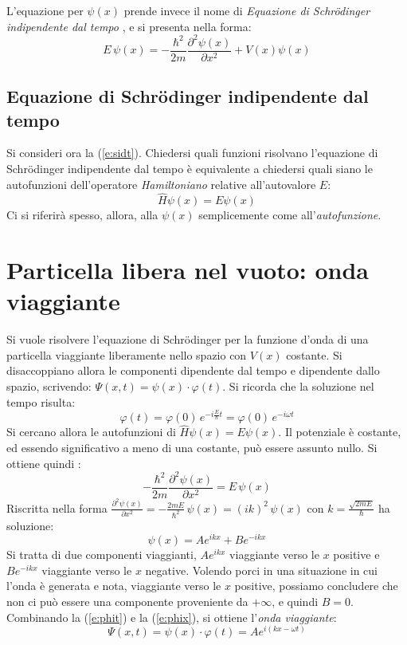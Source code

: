 \documentclass{article}
\newcommand{\schr}{Schr\"odinger }
\newcommand{\ham}{\emph{Hamiltoniano }}
\begin{document}
L'equazione per \(\psi(x)\) prende invece il nome di \emph{Equazione di \schr indipendente dal tempo }, e si presenta nella forma:
\begin{equation}
\label{e:sidt}
    E\,\psi(x) = -\frac{\hbar^2}{2m}\frac{\partial^2\psi(x) }{\partial x^2}+V(x)\psi(x)
\end{equation}



\subsection{Equazione di \schr indipendente dal tempo}
Si consideri ora la (\ref{e:sidt}). Chiedersi quali funzioni risolvano l'equazione di \schr indipendente dal tempo è equivalente a chiedersi quali siano le autofunzioni dell'operatore \ham relative all'autovalore \(E\):
\[\hat H \psi(x)= E \psi(x)\]
Ci si riferirà spesso, allora, alla \(\psi(x)\) semplicemente come all'\emph{autofunzione}.




\section{Particella libera nel vuoto: onda viaggiante}
\label{section:ondaviaggiante}
Si vuole risolvere l'equazione di \schr per la funzione d'onda di una particella viaggiante liberamente nello spazio con \(V(x)\) costante.
Si disaccoppiano allora le componenti dipendente dal tempo e dipendente dallo spazio, scrivendo: \(\Psi(x,t) = \psi(x)\cdot \varphi (t)\). Si ricorda che la soluzione nel tempo risulta:
\begin{equation}
\label{e:phit}
\varphi(t) = \varphi(0)\, e^{-i\frac{E}{\hbar}t}= \varphi(0)\, e^{-i\omega t}
\end{equation}
Si cercano allora le autofunzioni di \(\hat H \psi(x)= E \psi(x)\). Il potenziale è costante, ed essendo significativo a meno di una costante, può essere assunto nullo. Si ottiene quindi :
\[-\frac{\hbar^2}{2m}\frac{\partial^2\psi(x) }{\partial x^2}= E\,\psi(x) \]
Riscritta nella forma \(\frac{\partial^2\psi(x) }{\partial x^2}=-\frac{{2mE}}{\hbar^2}\,\psi(x) =  (ik)^2\,\psi(x)\) con \( k =  \frac{\sqrt{2mE}}{\hbar} \) ha soluzione:
\begin{equation}
\label{e:phix}
\psi(x) = Ae^{ikx}+Be^{-ikx}
\end{equation}
Si tratta di due componenti viaggianti, \(Ae^{ikx}\) viaggiante verso le \(x\) positive e  \(Be^{-ikx}\) viaggiante verso le \(x\) negative. Volendo porci in una situazione in cui l'onda è generata e nota, viaggiante verso le \(x\) positive, possiamo concludere che non ci può essere una componente proveniente da \( +\infty\), e quindi \(B = 0\). Combinando la (\ref{e:phit}) e la (\ref{e:phix}), si ottiene l'\emph{onda viaggiante}:
\begin{equation}
\label{e:ondaviaggiante}
\Psi(x,t) = \psi(x)\cdot \varphi (t) = Ae^{i(kx-\omega t)}
\end{equation}
\end{document}

